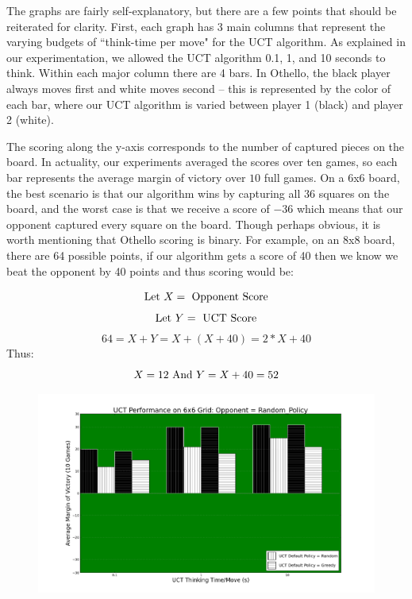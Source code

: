 \documentclass[12pt,letterpaper]{article}
\begin{document}
The graphs are fairly self-explanatory, but there are a few points that should be reiterated for clarity.  First, each graph has 3 main columns that represent the varying budgets of ``think-time per move" for the UCT algorithm.  As explained in our experimentation, we allowed the UCT algorithm 0.1, 1, and 10 seconds to think. Within each major column there are 4 bars.  In Othello, the black player always moves first and white moves second -- this is represented by the color of each bar, where our UCT algorithm is varied between player 1 (black) and player 2 (white). 

The scoring along the y-axis corresponds to the number of captured pieces on the board. In actuality, our experiments averaged the scores over ten games, so each bar represents the average margin of victory over $10$ full games. On a 6x6 board, the best scenario is that our algorithm wins by capturing all $36$ squares on the board, and the worst case is that we receive a score of $-36$ which means that our opponent captured every square on the board. Though perhaps obvious, it is worth mentioning that Othello scoring is binary. For example, on an 8x8 board, there are 64 possible points, if our algorithm gets a score of 40 then we know we beat the opponent by 40 points and thus scoring would be:
\vspace{-.4in}
\begin{center}
$$\textnormal{Let } X = \textnormal{ Opponent Score} $$
$$\textnormal{Let } Y = \textnormal{ UCT Score} $$
$$ 64 = X+Y = X+(X+40) = 2*X + 40$$ 
Thus:
$$ X = 12 \textnormal{  And   } Y = X+40 = 52$$ 
\end{center}

\begin{figure}[!hp]
\begin{center}
\includegraphics[scale=.4]{66_Random_Policy}
\end{center}
\end{figure}
\end{document}
